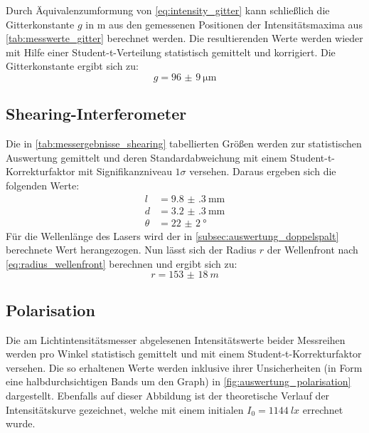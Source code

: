 \documentclass[ngerman]{scrartcl}
\begin{document}
%
Durch Äquivalenzumformung von \autoref{eq:intensity_gitter} kann schließlich die Gitterkonstante $g$ in \si{m} aus den gemessenen Positionen der Intensitätsmaxima aus \autoref{tab:messwerte_gitter} berechnet werden. Die resultierenden Werte werden wieder mit Hilfe einer Student-t-Verteilung statistisch gemittelt und korrigiert. Die Gitterkonstante ergibt sich zu:
\[g = \SI{96(9)}{\micro\meter}\]



\subsection{Shearing-Interferometer}
\label{subsec:auswertung_shearing}

Die in \autoref{tab:messergebnisse_shearing} tabellierten Größen werden zur statistischen Auswertung gemittelt und deren Standardabweichung mit einem Student-t-Korrekturfaktor mit Signifikanzniveau $1\sigma$ versehen. Daraus ergeben sich die folgenden Werte:
\begin{align*}
    l      & = \SI{9.8(3)}{\milli\meter} \\
    d      & = \SI{3.2(3)}{\milli\meter} \\
    \theta & = \SI{22(2)}{\degree}
\end{align*}
Für die Wellenlänge des Lasers wird der in \autoref{subsec:auswertung_doppelspalt} berechnete Wert herangezogen. Nun lässt sich der Radius $r$ der Wellenfront nach \autoref{eq:radius_wellenfront} berechnen und ergibt sich zu:
\[r=\SI{153(18)}{m}\]


\subsection{Polarisation}
\label{subsec:auswertung_polarisation}

Die am Lichtintensitätsmesser abgelesenen Intensitätswerte beider Messreihen werden pro Winkel statistisch gemittelt und mit einem Student-t-Korrekturfaktor versehen. Die so erhaltenen Werte werden inklusive ihrer Unsicherheiten (in Form eine halbdurchsichtigen Bands um den Graph) in \autoref{fig:auswertung_polarisation} dargestellt. Ebenfalls auf dieser Abbildung ist der theoretische Verlauf der Intensitätskurve gezeichnet, welche mit einem initialen $I_0 = \SI{1144}{lx}$ errechnet wurde.
\end{document}
